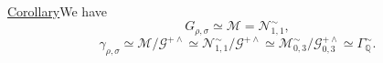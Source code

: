 \uline{Corollary}\quad We have
\[
G_{\rho,\sigma}\simeq\mathcal M=\mathcal N_{1,1}^{\sim},
\]
\[
\gamma_{\rho,\sigma}\simeq
\mathcal M/\mathcal G^{+\wedge}
\simeq\mathcal N_{1,1}^{\sim}/\mathcal G^{+\wedge}
\simeq\mathcal M_{0,3}^{\sim}/\mathcal G_{0,3}^{+\wedge}
\simeq\Gamma_{\mathbb Q}^{\sim}.
\]



